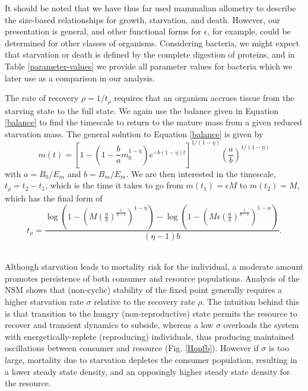 \documentclass[12pt,english]{article}
\begin{document}
\begin{spacing}{1.9}
It should be noted that we have thus far used mammalian allometry to describe the size-based relationships for growth, starvation, and death. However, our presentation is general, and other functional forms for $\epsilon$, for example, could be determined for other classes of organisms. Considering bacteria, we might expect that starvation or death is defined by the complete digestion of proteins, and in Table \ref{parameter-values} we provide all parameter values for bacteria which we later use as a comparison in our analysis. 

The rate of recovery $\rho = 1/t_\rho$ requires that an organism accrues tissue from the starving state to the full state.
We again use the balance given in Equation \ref{balance} to find the timescale to return to the mature mass from a given reduced starvation mass. The general solution to Equation \ref{balance} is given by
\begin{equation}
m\left(t\right)=\left[1-\left(1-\frac{b}{a}m_{0}^{1-\eta}\right)e^{-b\left(1-\eta\right)t}\right]^{1/\left(1-\eta\right)}\left(\frac{a}{b}\right)^{1/\left(1-\eta\right)}
\end{equation}
with $a=B_{0}/E_{m}$ and $b=B_{m}/E_{m}$. We are then interested in the timescale, $t_{\rho}=t_{2}-t_{1}$, which is the time it takes to go from $m\left(t_{1}\right)=\epsilon M$ to $m\left(t_{2}\right)=M$, which has the final form of 
\begin{equation}
t_{\rho}=\frac{\log \left(1-\left(M \left(\frac{a}{b}\right)^{\frac{1}{\eta -1}}\right)^{1-\eta }\right)-\log \left(1-\left(M \epsilon  \left(\frac{a}{b}\right)^{\frac{1}{\eta
   -1}}\right)^{1-\alpha }\right)}{(\eta -1) b}.
\end{equation}








 \\ \noindent
Although starvation leads to mortality risk for the individual, a moderate amount promotes persistence of both consumer and resource populations.
Analysis of the NSM shows that (non-cyclic) stability of the fixed point generally requires a higher starvation rate $\sigma$ relative to the recovery rate $\rho$.
The intuition behind this is that transition to the hungry (non-reproductive) state permits the resource to recover and transient dynamics to subside, whereas a low $\sigma$ overloads the system with energetically-replete (reproducing) individuals, thus producing maintained oscillations between consumer and resource (Fig. \ref{Hopfb}).
However if $\sigma$ is too large, mortality due to starvation depletes the consumer population, resulting in a lower steady state density, and an opposingly higher steady state density for the resource.


\end{spacing}
\end{document}
